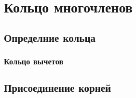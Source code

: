\section{Кольцо многочленов}
\subsection{Определние кольца}
\subsubsection{Кольцо вычетов}
\subsection{Присоединение корней}
